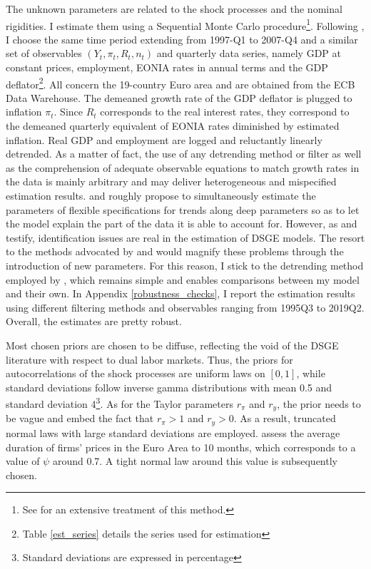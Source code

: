 The unknown parameters are related to the shock processes and the nominal rigidities. I estimate them using a Sequential Monte Carlo procedure\footnote{See \citet{RePEc:pup:pbooks:10612} for an extensive treatment of this method.}. Following \citet{thomas2009labor}, I choose the same time period extending from 1997-Q1 to 2007-Q4 and a similar set of observables $\left( Y_t, \pi_t, R_t, n_t \right)$ and quarterly data series, namely GDP at constant prices, employment, EONIA rates in annual terms and the GDP deflator\footnote{Table \ref{est_series} details the series used for estimation}. All concern the 19-country Euro area and are obtained from the ECB Data Warehouse. The demeaned growth rate of the GDP deflator is plugged to inflation $\pi_t$. Since $R_t$ corresponds to the real interest rates, they correspond to the demeaned quarterly equivalent of EONIA rates diminished by estimated inflation. Real GDP and employment are logged and reluctantly linearly detrended. As a matter of fact, the use of any detrending method or filter as well as the comprehension of adequate observable equations to match growth rates in the data is mainly arbitrary and may deliver heterogeneous and mispecified estimation results. \citet{RePEc:bpj:bejmac:v:11:y:2011:i:1:n:25} and \citet{CANOVA20141} roughly propose to simultaneously estimate the parameters of flexible specifications for trends along deep parameters so as to let the model explain the part of the data it is able to account for. However, as \citet{CANOVA2009431} and \citet{ISKREV2010189, iskrev2010evaluating} testify, identification issues are real in the estimation of DSGE models. The resort to the methods advocated by \citet{RePEc:bpj:bejmac:v:11:y:2011:i:1:n:25} and \citet{CANOVA20141} would magnify these problems through the introduction of new parameters. For this reason, I stick to the detrending method employed by \citet{thomas2009labor}, which remains simple and enables comparisons between my model and their own. In Appendix \ref{robustness_checks}, I report the estimation results using different filtering methods and observables ranging from 1995Q3 to 2019Q2. Overall, the estimates are pretty robust.

Most chosen priors are chosen to be diffuse, reflecting the void of the DSGE literature with respect to dual labor markets. Thus, the priors for autocorrelations of the shock processes are uniform laws on $[0,1]$, while standard deviations follow inverse gamma distributions with mean 0.5 and standard deviation 4\footnote{Standard deviations are expressed in percentage}. As for the Taylor parameters $r_\pi$ and $r_y$, the prior needs to be vague and embed the fact that $r_\pi > 1$ and $r_y > 0$. As a result, truncated normal laws with large standard deviations are employed. \citet{DRUANT2012772} assess the average duration of firms' prices in the Euro Area to 10 months, which corresponds to a value of $\psi$ around 0.7. A tight normal law around this value is subsequently chosen.

